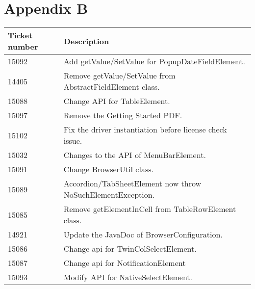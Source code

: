 	
\appendix
\section{Appendix B}
\label{appendixB}
\begin{table}
	\begin{tabular}{|l|l|}
	\hline
	Ticket number & Description \\ \hline
	\hline
	15092 & Add getValue/SetValue for PopupDateFieldElement. \\ \hline
	14405 & Remove getValue/SetValue from AbstractFieldElement class. \\ \hline
	15088 & Change API for TableElement. \\ \hline
	15097 & Remove the Getting Started PDF. \\ \hline
	15102 & Fix the driver instantiation before license check issue. \\ \hline
	15032 & Changes to the API of MenuBarElement. \\ \hline
	15091 & Change BrowserUtil class.\\ \hline
	15089 & Accordion/TabSheetElement now throw NoSuchElementException.\\ \hline
	15085 & Remove getElementInCell from TableRowElement class.\\ \hline
	14921 & Update the JavaDoc of BrowserConfiguration.\\ \hline
	15086 & Change api for TwinColSelectElement.\\ \hline
	15087 & Change api for NotificationElement \\ \hline
	15093 & Modify API for NativeSelectElement.\\ \hline
	

\end{tabular}
\end{table}
